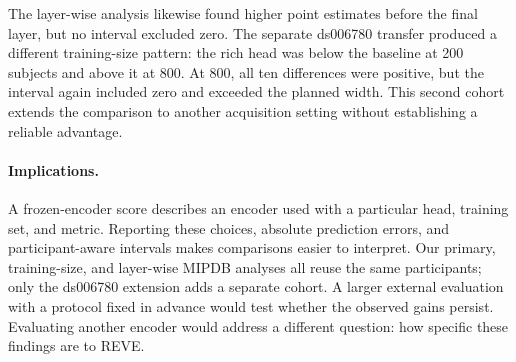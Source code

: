 The layer-wise analysis likewise found higher point estimates before the final
layer, but no interval excluded zero. The separate ds006780 transfer produced
a different training-size pattern: the rich head was below the baseline at
200 subjects and above it at 800. At 800, all ten differences were positive,
but the interval again included zero and exceeded the planned width. This
second cohort extends the comparison to another acquisition setting without
establishing a reliable advantage.

\paragraph{Implications.}
A frozen-encoder score describes an encoder used with a particular head,
training set, and metric. Reporting these choices, absolute prediction errors,
and participant-aware intervals makes comparisons easier to interpret. Our
primary, training-size, and layer-wise MIPDB analyses all reuse the same
participants; only the ds006780 extension adds a separate cohort. A larger
external evaluation with a protocol fixed in advance would test whether the
observed gains persist. Evaluating another encoder would address a different
question: how specific these findings are to REVE.

